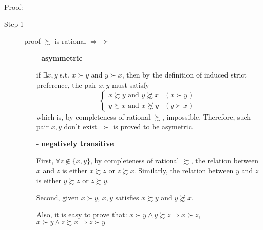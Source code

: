 Proof:
\begin{description}
    \item[Step 1] proof $\succsim$ is rational $\Rightarrow$ $\succ$ 
    \begin{itemize}
        \item[-] \textbf{asymmetric}
        
        if $\exists x,y$ s.t. $x\succ y$ and $y\succ x$, then by the definition of induced strict preference, the pair $x,y$ must satisfy 
        $$\begin{cases}
        x\succsim y\text{ and }y\not\succsim x & (x\succ y)\\
        y\succsim x\text{ and }x\not\succsim y & (y\succ x)
        \end{cases}$$
        which is, by completeness of rational $\succsim$, impossible. Therefore, such pair $x,y$ don't exist. $\succ$ is proved to be asymetric.
        
        \item[-] \textbf{negatively transitive}
        
        First, $\forall z\notin\{x,y\}$, by completeness of rational $\succsim$, the relation between $x$ and $z$ is either $x\succsim z$ or $z\succsim x$.
        Similarly, the relation between $y$ and $z$ is either $y\succsim z$ or $z\succsim y$.
        
        Second, given $x\succ y$, $x,y$ satisfies $x\succsim y$ and $y\not\succsim x$.
        
        Also, it is easy to prove that: $x\succ y \land y\succsim z \Rightarrow x\succ z$, $x\succ y \land z\succsim x\Rightarrow z\succ y$


\end{itemize}
\end{description}
